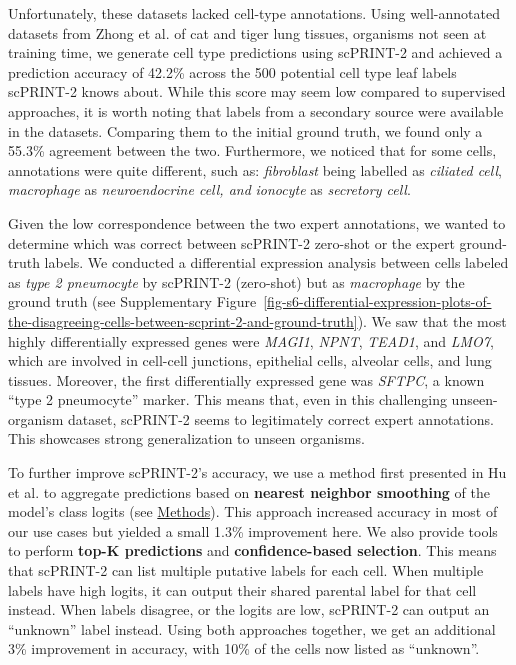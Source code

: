Unfortunately, these datasets lacked cell-type annotations. Using
well-annotated datasets from Zhong et al.\citep{zhongBenchmarkingCrossspeciesSinglecell2025} of cat and
tiger lung tissues, organisms not seen at training time, we generate
cell type predictions using \gls{scPRINT}-2 and achieved a prediction accuracy
of 42.2\% across the 500 potential cell type leaf labels \gls{scPRINT}-2 knows
about. While this score may seem low compared to supervised approaches,
it is worth noting that labels from a secondary source were available in
the datasets. Comparing them to the initial ground truth, we found only
a 55.3\% agreement between the two. Furthermore, we noticed that for
some cells, annotations were quite different, such as: \emph{fibroblast}
being labelled as \emph{ciliated cell}, \emph{macrophage} as
\emph{neuroendocrine cell, and} \emph{ionocyte} as \emph{secretory
cell}.

Given the low correspondence between the two expert annotations, we
wanted to determine which was correct between \gls{scPRINT}-2 zero-shot or the
expert ground-truth labels. We conducted a differential expression
analysis between cells labeled as \emph{type 2 pneumocyte} by \gls{scPRINT}-2
(zero-shot) but as \emph{macrophage} by the ground truth (see Supplementary
Figure~\ref{fig-s6-differential-expression-plots-of-the-disagreeing-cells-between-scprint-2-and-ground-truth}). We saw that the most highly differentially expressed genes
were \emph{MAGI1}, \emph{NPNT}, \emph{TEAD1}, and \emph{LMO7}, which are
involved in cell-cell junctions, epithelial cells, alveolar cells, and
lung tissues. Moreover, the first differentially expressed gene was
\emph{SFTPC}, a known ``type 2 pneumocyte'' marker. This means that,
even in this challenging unseen-organism dataset, \gls{scPRINT}-2 seems to
legitimately correct expert annotations. This showcases strong
generalization to unseen organisms.

To further improve \gls{scPRINT}-2's accuracy, we use a method first presented
in Hu et al. to aggregate predictions based on \textbf{nearest neighbor
smoothing} of the model's class logits (see
\hyperref[logits-refinement-laplacian-smoothing]{Methods})\citep{herrmannLaplacianIsoparametricGrid1976,huGRITGraphRegularized2025}.
This approach increased accuracy in most of our use cases but yielded a
small 1.3\% improvement here. We also provide tools to perform
\textbf{top-K predictions} and \textbf{confidence-based selection}. This
means that \gls{scPRINT}-2 can list multiple putative labels for each cell.
When multiple labels have high logits, it can output their shared
parental label for that cell instead. When labels disagree, or the
logits are low, \gls{scPRINT}-2 can output an ``unknown'' label instead. Using
both approaches together, we get an additional 3\% improvement in
accuracy, with 10\% of the cells now listed as ``unknown''.

